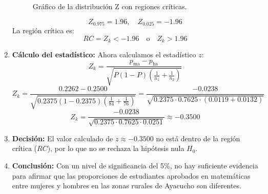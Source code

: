 \documentclass[
]{article}
\begin{document}
\begin{enumerate}
\begin{figure}[ht]
        \caption{Gráfico de la distribución Z con regiones críticas.}
    \end{figure}   
   \[
    Z_{0.975} = 1.96, \quad Z_{0.025} = -1.96
    \]
    La región crítica es:
    \[
    RC = Z_k < -1.96 \quad \text{o} \quad Z_k > 1.96
    \]
  \item \textbf{Cálculo del estadístico:}
    Ahora calculamos el estadístico \(z\):
    \[
    Z_k = \frac{p_{\text{ma}} - p_{\text{ha}}}{\sqrt{P(1 - P) \left( \frac{1}{n_1} + \frac{1}{n_2} \right)}}
    \]
    \[
    Z_k = \frac{0.2262 - 0.2500}{\sqrt{0.2375(1 - 0.2375) \left( \frac{1}{84} + \frac{1}{76} \right)}} = \frac{-0.0238}{\sqrt{0.2375 \cdot 0.7625 \cdot \left( 0.0119 + 0.0132 \right)}}
    \]
    \[
    Z_k = \frac{-0.0238}{\sqrt{0.2375 \cdot 0.7625 \cdot 0.0251}} \approx -0.3500
    \]

  \item \textbf{Decisión:}
    El valor calculado de \( z \approx -0.3500 \) no está dentro de la región crítica (\(RC\)), por lo que no se rechaza la hipótesis nula \(H_0\).
    
  \item \textbf{Conclusión:}
    Con un nivel de significancia del 5\%, no hay suficiente evidencia para afirmar que las proporciones de estudiantes aprobados en matemáticas entre mujeres y hombres en las zonas rurales de Ayacucho son diferentes.
\end{enumerate}
\end{document}
